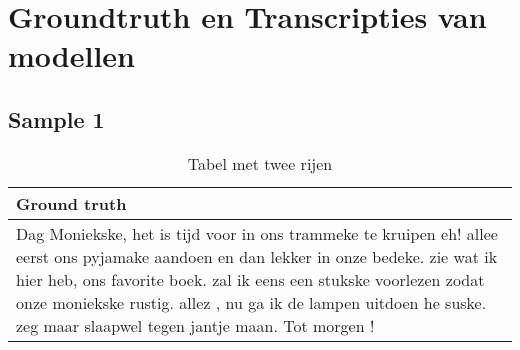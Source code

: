 \section{Groundtruth en Transcripties van modellen}


\subsection{Sample 1}

\begin{table}[htbp]
    \centering
    \label{tab:groundtruth_sample1}
    \begin{tabularx}{\textwidth}{|X|}
        \hline
            \textbf{Ground truth} \\
          
        \hline
            Dag Moniekske, het is tijd voor in ons trammeke te kruipen eh! allee eerst ons pyjamake aandoen en dan lekker in onze bedeke. zie wat ik hier heb, ons favorite boek. zal ik eens een stukske voorlezen zodat onze moniekske rustig. allez , nu ga ik de lampen uitdoen he suske. zeg maar slaapwel tegen jantje maan. Tot morgen ! \\
        \hline
    \end{tabularx}
    \caption{Tabel met twee rijen}
\end{table}


